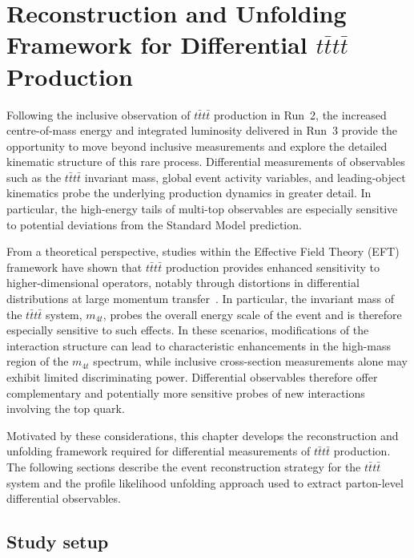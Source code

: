 ﻿%

\chapter{Reconstruction and Unfolding Framework for Differential $t\bar{t}t\bar{t}$ Production}
\label{chap:Difftttt}

Following the inclusive observation of $t\bar{t}t\bar{t}$ production in Run~2, the increased centre-of-mass energy and integrated luminosity delivered in Run~3 provide the opportunity to move beyond inclusive measurements and explore the detailed kinematic structure of this rare process.
Differential measurements of observables such as the $t\bar{t}t\bar{t}$ invariant mass, global event activity variables, and leading-object kinematics probe the underlying production dynamics in greater detail. In particular, the high-energy tails of multi-top observables are especially sensitive to potential deviations from the Standard Model prediction.

From a theoretical perspective, studies within the Effective Field Theory (EFT) framework have shown that $t\bar{t}t\bar{t}$ production provides enhanced sensitivity to higher-dimensional operators, notably through distortions in differential distributions at large momentum transfer~\cite{FourTopEFTStudy}. 
In particular, the invariant mass of the $t\bar{t}t\bar{t}$ system, $m_{4t}$, probes the overall energy scale of the event and is therefore especially sensitive to such effects. 
In these scenarios, modifications of the interaction structure can lead to characteristic enhancements in the high-mass region of the $m_{4t}$ spectrum, while inclusive cross-section measurements alone may exhibit limited discriminating power. 
Differential observables therefore offer complementary and potentially more sensitive probes of new interactions involving the top quark.

Motivated by these considerations, this chapter develops the reconstruction and unfolding framework required for differential measurements of $t\bar{t}t\bar{t}$ production. 
The following sections describe the event reconstruction strategy for the $t\bar{t}t\bar{t}$ system and the profile likelihood unfolding approach used to extract parton-level differential observables.

\section{Study setup}

